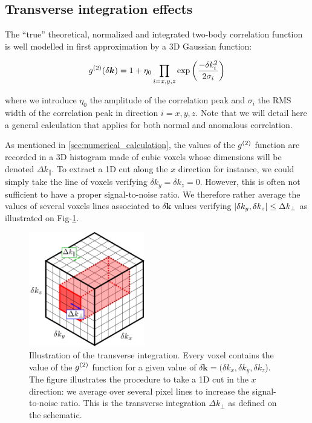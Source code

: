\subsection{Transverse integration effects}

The ``true'' theoretical, normalized and integrated two-body correlation function is well modelled in first approximation by a 3D Gaussian function:

\begin{equation}
    g^{(2)} (\delta \bm{k}) = 1 + \eta_0 \prod_{i=x,y,z} \exp \left(\frac{-\delta k_i^2}{2 \sigma_i}\right)
    \label{eq:g2_theo}
\end{equation}

\noindent where we introduce $\eta_0$ the amplitude of the correlation peak and $\sigma_i$ the RMS width of the correlation peak in direction $i=x,y,z$. Note that we will detail here a general calculation that applies for both normal and anomalous correlation.

As mentioned in \ref{sec:numerical_calculation}, the values of the $g^{(2)}$ function are recorded in a 3D histogram made of cubic voxels whose dimensions will be denoted $\Delta k_{\parallel}$. To extract a 1D cut along the $x$ direction for instance, we could simply take the line of voxels verifying $\delta k_y=\delta k_z =0$. However, this is often not sufficient to have a proper signal-to-noise ratio. We therefore rather average the values of several voxels lines associated to $\delta \bm{k}$ values verifying $\left\lvert\delta k_y, \delta k_z\right\rvert \leq \Delta k_{\perp}$ as illustrated on Fig-\ref{fig:cube_integration}.

\begin{figure}
    \centering
    \includegraphics[width=0.45\textwidth]{Fig/Chapter4/cube_integration.png}
    \caption{Illustration of the transverse integration. Every voxel contains the value of the $g^{(2)}$ function for a given value of $\delta \bm{k}=(\delta k_x, \delta k_y, \delta k_z$). The figure illustrates the procedure to take a 1D cut in the $x$ direction: we average over several pixel lines to increase the signal-to-noise ratio. This is the transverse integration $\Delta k_{\perp}$ as defined on the schematic.}
    \label{fig:cube_integration}
\end{figure}

